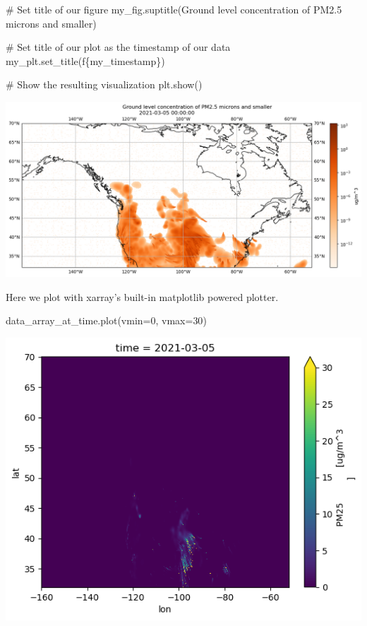 \documentclass[
  letterpaper,
  DIV=11,
  numbers=noendperiod]{scrreprt}
\newenvironment{Shaded}{\begin{snugshade}}{\end{snugshade}}
\newcommand{\CommentTok}[1]{\textcolor[rgb]{0.37,0.37,0.37}{#1}}
\newcommand{\DecValTok}[1]{\textcolor[rgb]{0.68,0.00,0.00}{#1}}
\newcommand{\NormalTok}[1]{\textcolor[rgb]{0.00,0.23,0.31}{#1}}
\newcommand{\OperatorTok}[1]{\textcolor[rgb]{0.37,0.37,0.37}{#1}}
\newcommand{\SpecialCharTok}[1]{\textcolor[rgb]{0.37,0.37,0.37}{#1}}
\newcommand{\SpecialStringTok}[1]{\textcolor[rgb]{0.13,0.47,0.30}{#1}}
\newcommand{\StringTok}[1]{\textcolor[rgb]{0.13,0.47,0.30}{#1}}
\begin{document}
\begin{Shaded}
\begin{Highlighting}[]
\CommentTok{\# Set title of our figure}
\NormalTok{my\_fig.suptitle(}\StringTok{\textquotesingle{}Ground level concentration of PM2.5 microns and smaller\textquotesingle{}}\NormalTok{)}

\CommentTok{\# Set title of our plot as the timestamp of our data}
\NormalTok{my\_plt.set\_title(}\SpecialStringTok{f\textquotesingle{}}\SpecialCharTok{\{}\NormalTok{my\_timestamp}\SpecialCharTok{\}}\SpecialStringTok{\textquotesingle{}}\NormalTok{)}

\CommentTok{\# Show the resulting visualization}
\NormalTok{plt.show()}
\end{Highlighting}
\end{Shaded}

\includegraphics{demo_files/figure-latex/data_notebooks-demo-demo-cell-14-output-1.png}

Here we plot with xarray's built-in matplotlib powered plotter.

\begin{Shaded}
\begin{Highlighting}[]
\NormalTok{data\_array\_at\_time.plot(vmin}\OperatorTok{=}\DecValTok{0}\NormalTok{, vmax}\OperatorTok{=}\DecValTok{30}\NormalTok{)}
\end{Highlighting}
\end{Shaded}

\includegraphics{demo_files/figure-latex/data_notebooks-demo-demo-cell-15-output-1.png}
\end{document}
